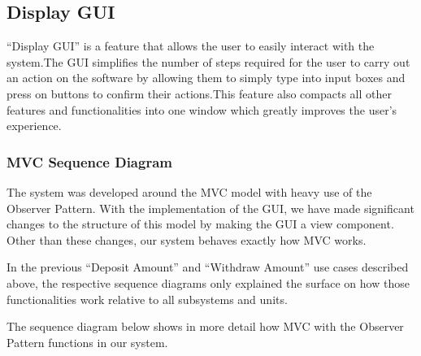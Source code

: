 \documentclass[12pt]{article}
\begin{document}
\subsection{Display GUI}
“Display GUI” is a feature that allows the user to easily interact with the system.The GUI simplifies the number of steps required for the user to carry out an action on the software by allowing them to simply type into input boxes and press on buttons to confirm their actions.This feature also compacts all other features and functionalities into one window which greatly improves the user’s experience. 

\subsubsection{MVC Sequence Diagram}

The system was developed around the MVC model with heavy use of the Observer Pattern. With the implementation of the GUI, we have made significant changes to the structure of this model by making the GUI a view component. Other than these changes, our system behaves exactly how MVC works. 

In the previous “Deposit Amount” and “Withdraw Amount” use cases described above, the respective sequence diagrams only explained the surface on how those functionalities work relative to all subsystems and units.

The sequence diagram below shows in more detail how MVC with the Observer Pattern functions in our system.    

\end{document}
